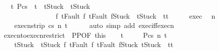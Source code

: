 \begin{isabellebody}
\ \ \ {\isachardoublequoteopen}{\isasymexists}t{\isacharprime}{\isachardot}\ {\isasymGamma}{\isacharbar}\isactrlbsub P\isactrlesub {\isasymturnstile}{\isasymlangle}c{\isacharcomma}s{\isasymrangle}\ {\isasymRightarrow}\ t{\isacharprime}\ {\isasymand}\ {\isacharparenleft}t{\isacharequal}Stuck\ {\isasymlongrightarrow}\ t{\isacharprime}{\isacharequal}Stuck{\isacharparenright}\ {\isasymand}\ \isanewline
\ \ \ \ \ \ \ \ \ \ \ \ \ \ \ \ {\isacharparenleft}{\isasymforall}f{\isachardot}\ t{\isacharequal}Fault\ f{\isasymlongrightarrow}\ t{\isacharprime}{\isasymin}{\isacharbraceleft}Fault\ f{\isacharcomma}Stuck{\isacharbraceright}{\isacharparenright}\ {\isasymand}\ {\isacharparenleft}t{\isacharprime}{\isasymnoteq}Stuck\ {\isasymlongrightarrow}\ t{\isacharprime}{\isacharequal}t{\isacharparenright}{\isachardoublequoteclose}\isanewline
%
\isadelimproof
%
\endisadelimproof
%
\isatagproof
{}\isamarkupfalse%
\ {\isacharminus}\isanewline
\ \ \isamarkupfalse%
\ exec\ \isamarkupfalse%
\ n\ \ \isanewline
\ \ \ \ execn{\isacharunderscore}strip{\isacharcolon}\ {\isachardoublequoteopen}{\isasymGamma}{\isasymturnstile}{\isasymlangle}c{\isacharcomma}s{\isasymrangle}\ {\isacharequal}n{\isasymRightarrow}\ t{\isachardoublequoteclose}\isanewline
\ \ \ \ \isamarkupfalse%
\ {\isacharparenleft}auto\ simp\ add{\isacharcolon}\ exec{\isacharunderscore}iff{\isacharunderscore}execn{\isacharparenright}\isanewline
\ \ \isamarkupfalse%
\ execn{\isacharunderscore}to{\isacharunderscore}execn{\isacharunderscore}restrict\ {\isacharbrackleft}\ P{\isacharequal}P{\isacharcomma}OF\ this{\isacharbrackright}\isanewline
\ \ \isamarkupfalse%
\ t{\isacharprime}\ \isanewline
\ \ \ \ {\isachardoublequoteopen}{\isasymGamma}{\isacharbar}\isactrlbsub P\isactrlesub {\isasymturnstile}{\isasymlangle}c{\isacharcomma}s{\isasymrangle}\ {\isacharequal}n{\isasymRightarrow}\ t{\isacharprime}{\isachardoublequoteclose}\ \ \isanewline
\ \ \ \ {\isachardoublequoteopen}t{\isacharequal}Stuck\ {\isasymlongrightarrow}\ t{\isacharprime}{\isacharequal}Stuck{\isachardoublequoteclose}\ {\isachardoublequoteopen}{\isasymforall}f{\isachardot}\ t{\isacharequal}Fault\ f{\isasymlongrightarrow}\ t{\isacharprime}{\isasymin}{\isacharbraceleft}Fault\ f{\isacharcomma}Stuck{\isacharbraceright}{\isachardoublequoteclose}\ {\isachardoublequoteopen}t{\isacharprime}{\isasymnoteq}Stuck\ {\isasymlongrightarrow}\ t{\isacharprime}{\isacharequal}t{\isachardoublequoteclose}\isanewline

\end{isabellebody}
